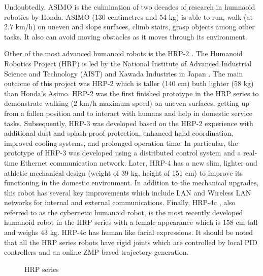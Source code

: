 Undoubtedly, ASIMO is the culmination of two decades of research in humnaoid robotics by Honda. ASIMO (130 centimetres and 54 kg) is able to run, walk (at 2.7 km/h) on uneven and slope surfaces, climb stairs, grasp objects among other tasks. It also can avoid moving obstacles as it moves through its environment. 

Other of the most advanced humanoid robots is the HRP-2 . The Humanoid Robotics Project (HRP) is led by the National Institute of Advanced Industrial Science and Technology (AIST) and Kawada Industries in Japan \cite{Kaneko2004}. The main outcome of this project was HRP-2 which is taller (140 cm) buth lighter (58 kg) than Honda's Asimo. HRP-2 was the first finished prototype in the HRP series to demonstrate walking (2 km/h maximum speed) on uneven surfaces, getting up from a fallen position and to interact with humans and help in domestic service tasks. Subsequently, HRP-3 was developed based on the HRP-2 experience with additional dust and splash-proof protection, enhanced hand coordination, improved cooling systems, and prolonged operation time. In particular, the prototype of HRP-3 \cite{Kanehiro2006} was developed using a distributed control system and a real-time Ethernet communication network. Later, HRP-4 has a new slim, lighter and athletic mechanical design (weight of 39 kg, height of 151 cm) to improve its functioning in the domestic environment. In addition to the mechanical upgrades, this robot has several key improvements which include LAN and Wireless LAN networks for internal and external communications. Finally, HRP-4c \cite{Kan2011}, also referred to as the cybernetic humanoid robot, is the most recently developed humanoid robot in the HRP series with a female appearance which is 158 cm tall and weighs 43 kg. HRP-4c has human like facial expressions. It should be noted that all the HRP series robots have rigid joints which are controlled by local PID controllers and an online ZMP based trajectory generation.

\begin{figure}[!hbt]
\centering 
{}\hspace{5mm}
\hspace{5mm}
\hspace{5mm}
\caption{HRP series}
\label{fig:hrp}
\end{figure}

